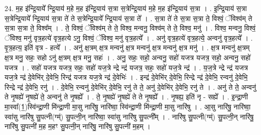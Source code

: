 \documentclass[17pt]{extarticle}
\begin{document}
24. म॒ह इ॑न्द्रि॒याये᳚ न्द्रि॒याय॑ म॒हे म॒ह इ॑न्द्रि॒याय॑ स॒त्रा स॒त्रेन्द्रि॒याय॑ म॒हे म॒ह इ॑न्द्रि॒याय॑ स॒त्रा । . इ॒न्द्रि॒याय॑ स॒त्रा स॒त्रेन्द्रि॒याये᳚ न्द्रि॒याय॑ स॒त्रा ते॑ ते स॒त्रेन्द्रि॒याये᳚ न्द्रि॒याय॑ स॒त्रा ते᳚ । . स॒त्रा ते॑ ते स॒त्रा स॒त्रा ते॒ विश्वं॒ ॅविश्व॑म् ते स॒त्रा स॒त्रा ते॒ विश्व᳚म् । . ते॒ विश्वं॒ ॅविश्व॑म् ते ते॒ विश्व॒ मन्वनु॒ विश्व॑म् ते ते॒ विश्व॒ मनु॑ । . विश्व॒ मन्वनु॒ विश्वं॒ ॅविश्व॒ मनु॑ वृत्र॒हत्ये॑ वृत्र॒हत्ये ऽनु॒ विश्वं॒ ॅविश्व॒ मनु॑ वृत्र॒हत्ये᳚ । . अनु॑ वृत्र॒हत्ये॑ वृत्र॒हत्ये॒ अन्वनु॑ वृत्र॒हत्ये᳚ । . वृ॒त्र॒हत्य॒ इति॑ वृत्र - हत्ये᳚ । . अनु॑ क्ष॒त्रम् क्ष॒त्र मन्वनु॑ क्ष॒त्र मन्वनु॑ क्ष॒त्र मन्वनु॑ क्ष॒त्र मनु॑ । . क्ष॒त्र मन्वनु॑ क्ष॒त्रम् क्ष॒त्र मनु॒ सहः॒ सहो ऽनु॑ क्ष॒त्रम् क्ष॒त्र मनु॒ सहः॑ । . अनु॒ सहः॒ सहो॒ अन्वनु॒ सहो॑ यजत्र यजत्र॒ सहो॒ अन्वनु॒ सहो॑ यजत्र । . सहो॑ यजत्र यजत्र॒ सहः॒ सहो॑ यज॒त्रे न्द्रे न्द्र॑ यजत्र॒ सहः॒ सहो॑ यज॒त्रे न्द्र॑ । . य॒ज॒त्रे न्द्रे न्द्र॑ यजत्र यज॒त्रे न्द्र॑ दे॒वेभि॑र् दे॒वेभि॒ रिन्द्र॑ यजत्र यज॒त्रे न्द्र॑ दे॒वेभिः॑ । . इन्द्र॑ दे॒वेभि॑र् दे॒वेभि॒ रिन्द्रे न्द्र॑ दे॒वेभि॒ रन्वनु॑ दे॒वेभि॒ रिन्द्रे न्द्र॑ दे॒वेभि॒ रनु॑ । . दे॒वेभि॒ रन्वनु॑ दे॒वेभि॑र् दे॒वेभि॒ रनु॑ ते ते॒ अनु॑ दे॒वेभि॑र् दे॒वेभि॒ रनु॑ ते । . अनु॑ ते ते॒ अन्वनु॑ ते नृ॒षह्ये॑ नृ॒षह्ये॑ ते॒ अन्वनु॑ ते नृ॒षह्ये᳚ । . ते॒ नृ॒षह्ये॑ नृ॒षह्ये॑ ते ते नृ॒षह्ये᳚ । . नृ॒षह्य॒ इति॑ नृ - सह्ये᳚ । . इ॒न्द्रा॒णी मा॒स्वा᳚(1॒)स्वि॑न्द्रा॒णी मि॑न्द्रा॒णी मा॒सु नारि॑षु॒ नारि॑ष्वा॒ स्वि॑न्द्रा॒णी मि॑न्द्रा॒णी मा॒सु नारि॑षु । . आ॒सु नारि॑षु॒ नारि॑ष्वा॒ स्वा॑सु नारि॑षु सु॒पत्नी(ग्म्॑) सु॒पत्नी॒न् नारि॑ष्वा॒ स्वा॑सु नारि॑षु सु॒पत्नी᳚म् । . नारि॑षु सु॒पत्नी(ग्म्॑) सु॒पत्नी॒न् नारि॑षु॒ नारि॑षु सु॒पत्नी॑ म॒ह म॒हꣳ सु॒पत्नी॒न् नारि॑षु॒ नारि॑षु सु॒पत्नी॑ म॒हम् । \newline
\end{document}
